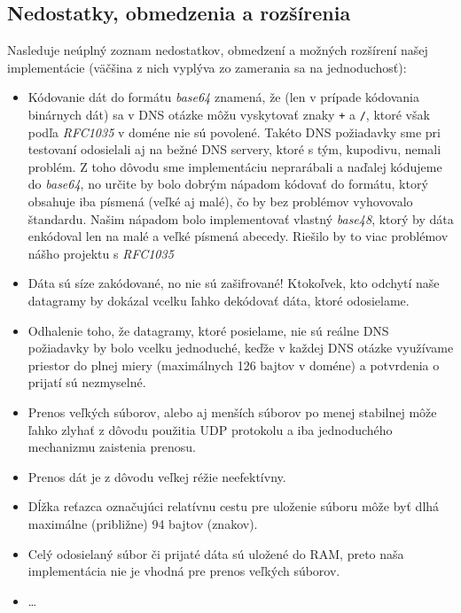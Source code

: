 \documentclass[a4paper]{article}
\begin{document}
  \subsection{Nedostatky, obmedzenia a rozšírenia}
  Nasleduje neúplný zoznam nedostatkov, obmedzení a možných rozšírení našej
  implementácie (väčšina z nich vyplýva zo zamerania sa na jednoduchosť):
  \begin{itemize}
    \item Kódovanie dát do formátu \textit{base64} znamená, že (len v prípade
      kódovania binárnych dát) sa v DNS otázke môžu vyskytovať znaky \verb|+| a
      \verb|/|, ktoré však podľa \textit{RFC1035} v doméne nie sú povolené.
      Takéto DNS požiadavky sme pri testovaní odosielali aj na bežné DNS
      servery, ktoré s tým, kupodivu, nemali problém. Z toho dôvodu sme
      implementáciu neprarábali a naďalej kódujeme do \textit{base64}, no
      určite by bolo dobrým nápadom kódovať do formátu, ktorý obsahuje iba
      písmená (veľké aj malé), čo by bez problémov vyhovovalo štandardu. Našim
      nápadom bolo implementovať vlastný \textit{base48}, ktorý by dáta
      enkódoval len na malé a veľké písmená abecedy. Riešilo by to viac
      problémov nášho projektu s \textit{RFC1035}
    \item Dáta sú síze zakódované, no nie sú zašifrované! Ktokoľvek, kto odchytí
      naše datagramy by dokázal vcelku ľahko dekódovať dáta, ktoré odosielame.
    \item Odhalenie toho, že datagramy, ktoré posielame, nie sú reálne DNS
      požiadavky by bolo vcelku jednoduché, keďže v každej DNS otázke využívame
      priestor do plnej miery (maximálnych 126 bajtov v doméne) a potvrdenia o
      prijatí sú nezmyselné.
    \item Prenos veľkých súborov, alebo aj menších súborov po menej stabilnej
      môže ľahko zlyhať z dôvodu použitia UDP protokolu a iba jednoduchého
      mechanizmu zaistenia prenosu.
    \item Prenos dát je z dôvodu veľkej réžie neefektívny.
    \item Dĺžka reťazca označujúci relatívnu cestu pre uloženie súboru môže byť
      dlhá maximálne (približne) 94 bajtov (znakov).
    \item Celý odosielaný súbor či prijaté dáta sú uložené do RAM, preto naša
      implementácia nie je vhodná pre prenos veľkých súborov.
    \item \ldots
  \end{itemize}
\end{document}
